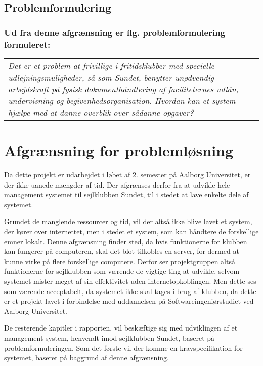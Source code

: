 
\subsection*{Problemformulering}
\subsubsection*{Ud fra denne afgrænsning er flg. problemformulering formuleret:}

\begin{center}
  \begin{tabular}{|p{14cm}|}
    \textit{Det er et problem at frivillige i fritidsklubber med specielle udlejningsmuligheder, så som Sundet, benytter unødvendig arbejdskraft på fysisk dokumenthåndtering af faciliteternes udlån, undervisning og begivenhedsorganisation. Hvordan kan et system hjælpe med at danne overblik over sådanne opgaver?}
  \end{tabular}
\end{center}


\section{Afgrænsning for problemløsning}

Da dette projekt er udarbejdet i løbet af 2. semester på Aalborg Universitet, er der ikke uanede mængder af tid. Der afgrænses derfor fra at udvikle hele management systemet til sejlklubben Sundet, til i stedet at lave enkelte dele af systemet.

Grundet de manglende ressourcer og tid, vil der altså ikke blive lavet et system, der kører over internettet,
men i stedet et system, som kan håndtere de forskellige emner lokalt. 
Denne afgrænsning finder sted, da hvis funktionerne for klubben kan fungerer på computeren, skal det blot tilkobles en server, for dermed at kunne
virke på flere forskellige computere.
Derfor ser projektgruppen altså funktionerne for sejlklubben som værende de vigtige ting at udvikle, selvom systemet mister meget af sin effektivitet uden internetopkoblingen. 
Men dette ses som værende acceptabelt, da systemet ikke skal tages i brug af klubben, da dette er et projekt lavet i forbindelse med uddannelsen på Softwareingeniørstudiet ved Aalborg Universitet.

De resterende kapitler i rapporten, vil beskæftige sig med udviklingen af et management system, henvendt imod
sejlklubben Sundet, baseret på problemformuleringen. Som det første vil der komme en kravspecifikation for
systemet, baseret på baggrund af denne afgrænsning.
